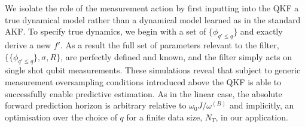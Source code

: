 We isolate the role of the measurement action by first inputting into the QKF a true dynamical model rather than a dynamical model learned as in the standard AKF.  To specify true dynamics, we begin with a set of $\{ \phi_{q'\leq q}\}$ and exactly derive a new $f'$.  As a result the full set of parameters relevant to the filter, $\{\{\phi_{q' \leq q} \}, \sigma, R\}$, are perfectly defined and known, and the filter simply acts on single shot qubit measurements.  These simulations reveal that subject to generic measurement oversampling conditions introduced above the QKF is able to successfully enable predictive estimation.  As in the linear case, the absolute forward prediction horizon is arbitrary relative to $\omega_0 J / \omega^{(B)}$ and implicitly, an optimisation over the choice of $q$ for a finite data size, $N_T$,  in our application. 

